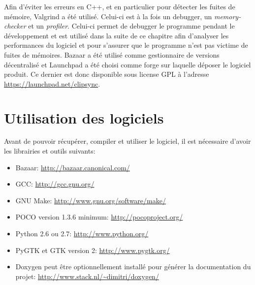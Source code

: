 Afin d'éviter les erreurs en C++, et en particulier pour détecter les fuites
de mémoire, Valgrind\cite{valgrind} a été utilisé. Celui-ci est à la fois un
debugger, un \emph{memory-checker} et un \emph{profiler}. Celui-ci permet
de debugger le programme pendant le développement et est utilisé dans la
suite de ce chapitre afin d'analyser les performances du logiciel et pour
s'assurer que le programme n'est pas victime de fuites de mémoires.
Bazaar\cite{bzr} a été utilisé comme gestionnaire de versions décentralisé et
Launchpad\cite{launchpad} a été choisi comme forge sur laquelle déposer le
logiciel produit. Ce dernier est donc disponible sous license GPL à l'adresse
\url{https://launchpad.net/clipsync}.

\section{Utilisation des logiciels}
Avant de pouvoir récupérer, compiler et utiliser le logiciel, il est nécessaire
d'avoir les librairies et outils suivants:
\begin{itemize}
\item Bazaar: \url{http://bazaar.canonical.com/}
\item GCC: \url{http://gcc.gnu.org/}
\item GNU Make: \url{http://www.gnu.org/software/make/}
\item POCO version 1.3.6 minimum: \url{http://pocoproject.org/}
\item Python 2.6 ou 2.7: \url{http://www.python.org/}
\item PyGTK et GTK version 2: \url{http://www.pygtk.org/}
\item Doxygen peut être optionnellement installé pour générer la documentation
  du projet: \url{http://www.stack.nl/~dimitri/doxygen/}
\end{itemize}

